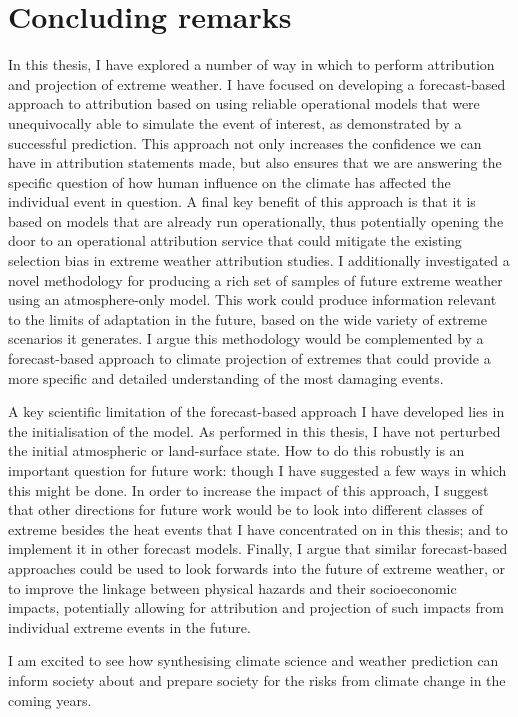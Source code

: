 \section{Concluding remarks}\label{discussion:remarks}

  In this thesis, I have explored a number of way in which to perform attribution and projection of extreme weather. I have focused on developing a forecast-based approach to attribution based on using reliable operational models that were unequivocally able to simulate the event of interest, as demonstrated by a successful prediction. This approach not only increases the confidence we can have in attribution statements made, but also ensures that we are answering the specific question of how human influence on the climate has affected the individual event in question. A final key benefit of this approach is that it is based on models that are already run operationally, thus potentially opening the door to an operational attribution service that could mitigate the existing selection bias in extreme weather attribution studies. I additionally investigated a novel methodology for producing a rich set of samples of future extreme weather using an atmosphere-only model. This work could produce information relevant to the limits of adaptation in the future, based on the wide variety of extreme scenarios it generates. I argue this methodology would be complemented by a forecast-based approach to climate projection of extremes that could provide a more specific and detailed understanding of the most damaging events. 

  A key scientific limitation of the forecast-based approach I have developed lies in the initialisation of the model. As performed in this thesis, I have not perturbed the initial atmospheric or land-surface state. How to do this robustly is an important question for future work: though I have suggested a few ways in which this might be done. In order to increase the impact of this approach, I suggest that other directions for future work would be to look into different classes of extreme besides the heat events that I have concentrated on in this thesis; and to implement it in other forecast models. Finally, I argue that similar forecast-based approaches could be used to look forwards into the future of extreme weather, or to improve the linkage between physical hazards and their socioeconomic impacts, potentially allowing for attribution and projection of such impacts from individual extreme events in the future.

  I am excited to see how synthesising climate science and weather prediction can inform society about and prepare society for the risks from climate change in the coming years.